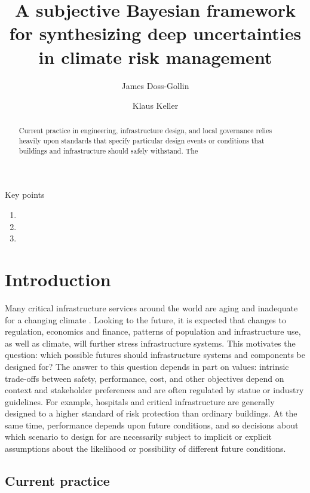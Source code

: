 \documentclass[11pt]{article}
\title{A subjective Bayesian framework for synthesizing deep uncertainties in climate risk management}
\author[1]{James Doss-Gollin}
\author[2]{Klaus Keller}
\affil[1]{Department of Civil and Environmental Engineering, Rice University}https://www.overleaf.com/project/6165ef2754a6517ec4648164
\affil[2]{Thayer School of Engineering, Dartmouth College}
\makeatletter
\DeclareRobustCommand\onedot{\futurelet\@let@token\@onedot}
\def\@onedot{\ifx\@let@token.\else.\null\fi\xspace}
\def\eg{\emph{e.g}\onedot} \def\Eg{\emph{E.g}\onedot}
\DeclareRobustCommand\onedot{\futurelet\@let@token\@onedot}
\def\@onedot{\ifx\@let@token.\else.\null\fi\xspace}
\def\eg{\emph{e.g}\onedot} \def\Eg{\emph{E.g}\onedot}
\makeatother
\begin{document}
\maketitle
\thispagestyle{empty}

\begin{abstract}
    Current practice in engineering, infrastructure design, and local governance relies heavily upon standards that specify particular design events or conditions that buildings and infrastructure should safely withstand.
    The
\end{abstract}

Key points
\begin{enumerate}
    \item
    \item
    \item
\end{enumerate}

\clearpage
\section{Introduction}\label{sec:introduction}

Many critical infrastructure services around the world are aging and inadequate for a changing climate \citep[\eg,][]{doss-gollin_txtreme:2021,doss-gollin_fatalism:2020,chester_reliable:2020}.
Looking to the future, it is expected that changes to regulation, economics and finance, patterns of population and infrastructure use, as well as climate, will further stress infrastructure systems.
This motivates the question: which possible futures should infrastructure systems and components be designed for?
The answer to this question depends in part on values: intrinsic trade-offs between safety, performance, cost, and other objectives depend on context and stakeholder preferences \citep{keller_management:2021} and are often regulated by statue or industry guidelines.
For example, hospitals and critical infrastructure are generally designed to a higher standard of risk protection than ordinary buildings.
At the same time, performance depends upon future conditions, and so decisions about which scenario to design for are necessarily subject to implicit or explicit assumptions about the likelihood or possibility of different future conditions.

\subsection{Current practice}
\end{document}
